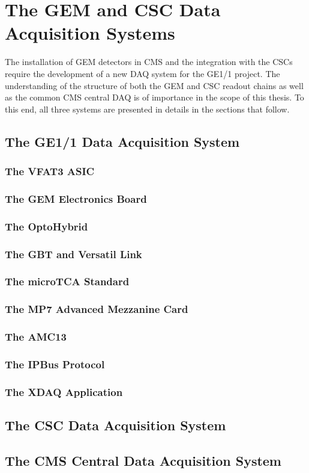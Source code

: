 \chapter{The GEM and CSC Data Acquisition Systems}
\label{chap:II-2-daq}

  The installation of GEM detectors in CMS and the integration with the CSCs require the development of a new DAQ system for the GE1/1 project. The understanding of the structure of both the GEM and CSC readout chains as well as the common CMS central DAQ is of importance in the scope of this thesis. To this end, all three systems are presented in details in the sections that follow. \\

  \section{The GE1/1 Data Acquisition System}

    \subsection{The VFAT3 ASIC}

    \subsection{The GEM Electronics Board}

    \subsection{The OptoHybrid}

    \subsection{The GBT and Versatil Link}

    \subsection{The microTCA Standard}

    \subsection{The MP7 Advanced Mezzanine Card}

    \subsection{The AMC13}

    \subsection{The IPBus Protocol}

    \subsection{The XDAQ Application}

  \section{The CSC Data Acquisition System}

  \section{The CMS Central Data Acquisition System}
